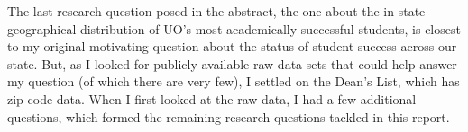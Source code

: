 \documentclass[10pt]{article}
\begin{document}
The last research question posed in the abstract, the one about the in-state geographical distribution of UO's most academically successful students, is closest to my original motivating question about the status of student success across our state. But, as I looked for publicly available raw data sets that could help answer my question (of which there are very few), I settled on the Dean's List, which has zip code data. When I first looked at the raw data, I had a few additional questions, which formed the remaining research questions tackled in this report.


\end{document}

